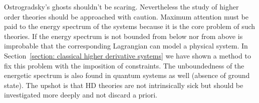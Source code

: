 Ostrogradsky's ghosts shouldn't be scaring. Nevertheless the study of higher
order theories should be approached with caution. Maximum attention must be paid
to the energy spectrum of the systems because it is the core problem of such
theories. If the energy spectrum is not bounded from below nor from above
is improbable that the corresponding Lagrangian can model a physical system.
In Section~\ref{section: classical higher derivative systems} we have shown a
method to fix this problem with the imposition of constraints. The unboundedness
of the energetic spectrum is also found in quantum systems as well (absence of
ground state). The upshot is that HD theories are not intrinsically sick but
should be investigated more deeply and not discard a priori.
